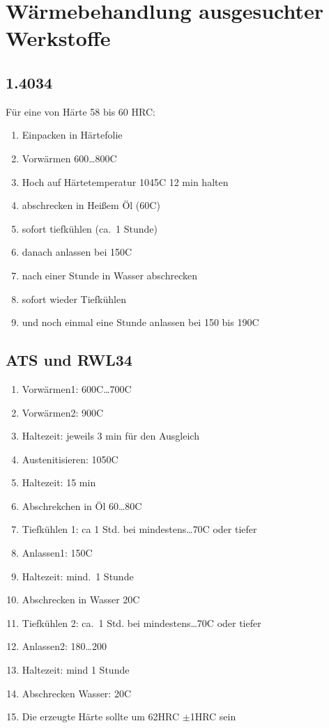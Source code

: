 \documentclass[a4paper]{scrartcl} %
\begin{document}

\section{Wärmebehandlung ausgesuchter Werkstoffe}
\subsection{1.4034}
Für eine von Härte 58 bis 60 HRC:
\begin{enumerate}
\item Einpacken in Härtefolie
\item Vorwärmen 600{\ldots}800{\degree}C
\item Hoch auf Härtetemperatur 1045{\degree}C 12 min halten
\item abschrecken in Heißem Öl (60{\degree}C)
\item sofort tiefkühlen (ca.\  1 Stunde)
\item danach anlassen bei 150{\degree}C
\item nach einer Stunde in Wasser abschrecken
\item sofort wieder Tiefkühlen
\item und noch einmal eine Stunde anlassen bei 150 bis 190{\degree}C
\end{enumerate}
\subsection{ATS und RWL34}
\begin{enumerate}
\item Vorwärmen1: 600{\degree}C{\ldots}700{\degree}C
\item Vorwärmen2: 900{\degree}C
\item Haltezeit: jeweils 3 min für den Ausgleich
\item Austenitisieren: 1050{\degree}C
\item Haltezeit: 15 min
\item Abschrekchen in Öl 60{\ldots}80{\degree}C
\item Tiefkühlen 1: ca 1 Std. bei mindestens{\ldots}70{\degree}C oder tiefer
\item Anlassen1: 150{\degree}C
\item Haltezeit: mind.\ 1 Stunde
\item Abschrecken in Wasser 20{\degree}C
\item Tiefkühlen 2: ca.\ 1 Std. bei mindestens{\ldots}70{\degree}C oder tiefer
\item Anlassen2: 180{\ldots}200
\item Haltezeit: mind 1 Stunde
\item Abschrecken Wasser: 20{\degree}C
\item Die erzeugte Härte sollte um 62HRC $\pm$1HRC sein 
\end{enumerate}
\end{document}
